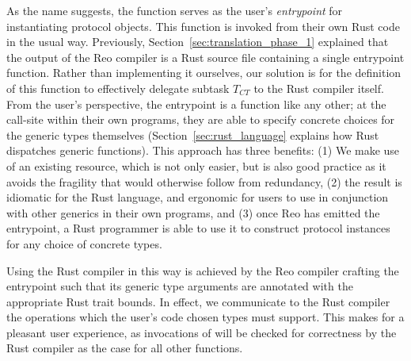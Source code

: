 As the name suggests, the  function serves as the user's \textit{entrypoint} for instantiating protocol objects. This function is invoked from their own Rust code in the usual way. Previously, Section~\ref{sec:translation_phase_1} explained that the output of the Reo compiler is a Rust source file containing a single entrypoint function. Rather than implementing it ourselves, our solution is for the definition of this function to effectively delegate subtask $T_{CT}$ to the Rust compiler itself. From the user's perspective, the entrypoint is a function like any other; at the call-site within their own programs, they are able to specify concrete choices for the generic types themselves (Section~\ref{sec:rust_language} explains how Rust dispatches generic functions).
This approach has three benefits: (1) We make use of an existing resource, which is not only easier, but is also good practice as it avoids the fragility that would otherwise follow from redundancy, (2) the result is idiomatic for the Rust language, and ergonomic for users to use in conjunction with other generics in their own programs, and (3) once Reo has emitted the entrypoint, a Rust programmer is able to use it to construct protocol instances for any choice of concrete types.

Using the Rust compiler in this way is achieved by the Reo compiler crafting the entrypoint such that its generic type arguments are annotated with the appropriate Rust trait bounds. In effect, we communicate to the Rust compiler the operations which the user's code chosen types must support. This makes for a pleasant user experience, as invocations of  will be checked for correctness by the Rust compiler as the case for all other functions.

